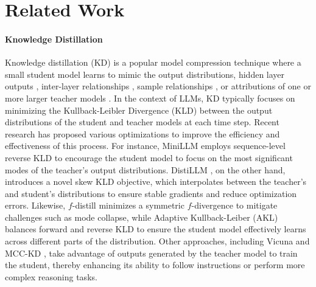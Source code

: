 \section{Related Work}
\label{gen_inst}
\vspace{-0.5em}
\paragraph{Knowledge Distillation}

Knowledge distillation (KD) \citep{hinton2015distilling} is a popular model compression technique where a small student model learns to mimic the output distributions, hidden layer outputs \citep{chen2017learning}, inter-layer relationships \citep{yim2017gift}, sample relationships \citep{reddi2021rankdistil}, or attributions \citep{wu2023ad} of one or more larger teacher models \citep{liu2020adaptive}. In the context of LLMs, KD typically focuses on minimizing the Kullback-Leibler Divergence (KLD) between the output distributions of the student and teacher models at each time step. Recent research has proposed various optimizations to improve the efficiency and effectiveness of this process. For instance, MiniLLM \citep{gu2024minillm} employs sequence-level reverse KLD to encourage the student model to focus on the most significant modes of the teacher's output distributions. DistiLLM \citep{ko2024distillm}, on the other hand, %
introduces a novel skew KLD objective, which interpolates between the teacher's and student's distributions to ensure stable gradients and reduce optimization errors.
Likewise, $f$-distill \citep{wen2023f} minimizes a symmetric $f$-divergence to mitigate challenges such as mode collapse, while Adaptive Kullback-Leiber (AKL) \citep{wu2024rethinking} balances forward and reverse KLD to ensure the student model effectively learns across different parts of the distribution. Other approaches, including Vicuna \citep{vicuna2023} and MCC-KD \citep{chen2023mcc}, take advantage of outputs generated by the teacher model to train the student, thereby enhancing its ability to follow instructions or perform more complex reasoning tasks.
\vspace{-0.5em}
